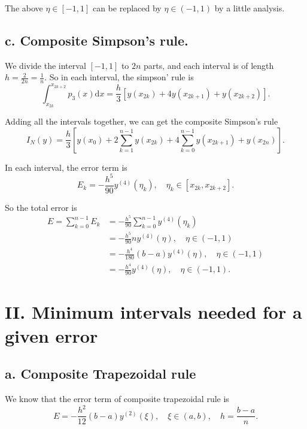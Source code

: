 \documentclass[a4paper]{article}
\begin{document}
The above $\eta \in [-1, 1]$ can be replaced by $\eta \in (-1, 1)$ by a little analysis.


\subsection*{c. Composite Simpson's rule.}

We divide the interval $[-1, 1]$ to $2n$ parts, and each interval is of length $h = \frac{2}{2n} = \frac{1}{n}$. So in each interval, the simpson' rule is 
\begin{equation}
    \int_{x_{2k}}^{x_{2k+2}} p_3(x) \mathrm{d} x = \frac{h}{3} [y(x_{2k}) + 4y(x_{2k+1}) + y(x_{2k+2})].
\end{equation}

Adding all the intervals together, we can get the composite Simpson's rule
\begin{equation}
    I_N (y) = \frac{h}{3} [y(x_0) + 2 \sum_{k=1}^{n-1} y(x_{2k}) + 4 \sum_{k=0}^{n-1} y(x_{2k+1}) + y(x_{2n})].
\end{equation}

In each interval, the error term is 
\begin{equation}
    E_k = -\frac{h^5}{90} y^{(4)} (\eta_k), \quad \eta_k \in [x_{2k}, x_{2k+2}].
\end{equation}

So the total error is 
\begin{equation}
  \begin{aligned}
    E = \sum_{k=0}^{n-1} E_k &= -\frac{h^5}{90} \sum_{k=0}^{n-1} y^{(4)} (\eta_k) \\
    &= -\frac{h^5}{90} n y^{(4)} (\eta), \quad \eta \in (-1, 1) \\
    &= -\frac{h^4}{180} (b-a) y^{(4)} (\eta), \quad \eta \in (-1, 1) \\
    &= -\frac{h^4}{90} y^{(4)} (\eta), \quad \eta \in (-1, 1).
  \end{aligned}
\end{equation}

\section*{II. Minimum intervals needed for a given error}

\subsection*{a. Composite Trapezoidal rule}
We know that the error term of composite trapezoidal rule is
\begin{equation}
    E = -\frac{h^2}{12} (b-a) y^{(2)} (\xi), \quad \xi \in (a, b), \quad h = \frac{b-a}{n}.
\end{equation}
\end{document}
